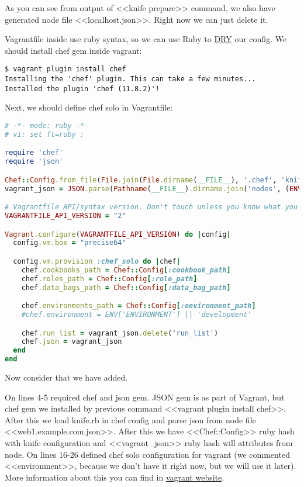 As you can see from output of <<knife prepare>> command, we also have generated node file <<localhost.json>>. Right now we can just delete it.

Vagrantfile inside use ruby syntax, so we can use Ruby to \href{http://en.wikipedia.org/wiki/Dont\_repeat\_yourself}{DRY} our config. We should install chef gem inside vagrant:

\begin{lstlisting}[label=lst:my-cloud-vagrant6,title=my-cloud/nodes/Vagrantfile]
$ vagrant plugin install chef
Installing the 'chef' plugin. This can take a few minutes...
Installed the plugin 'chef (11.8.2)'!
\end{lstlisting}

Next, we should define chef solo in Vagrantfile:

\begin{lstlisting}[language=Ruby,label=lst:my-cloud-vagrant7,title=my-cloud/nodes/Vagrantfile]
# -*- mode: ruby -*-
# vi: set ft=ruby :

require 'chef'
require 'json'

Chef::Config.from_file(File.join(File.dirname(__FILE__), '.chef', 'knife.rb'))
vagrant_json = JSON.parse(Pathname(__FILE__).dirname.join('nodes', (ENV['NODE'] || 'web1.example.com.json')).read)

# Vagrantfile API/syntax version. Don't touch unless you know what you're doing!
VAGRANTFILE_API_VERSION = "2"

Vagrant.configure(VAGRANTFILE_API_VERSION) do |config|
  config.vm.box = "precise64"

  config.vm.provision :chef_solo do |chef|
    chef.cookbooks_path = Chef::Config[:cookbook_path]
    chef.roles_path = Chef::Config[:role_path]
    chef.data_bags_path = Chef::Config[:data_bag_path]

    chef.environments_path = Chef::Config[:environment_path]
    #chef.environment = ENV['ENVIRONMENT'] || 'development'

    chef.run_list = vagrant_json.delete('run_list')
    chef.json = vagrant_json
  end
end
\end{lstlisting}

Now consider that we have added.

On lines 4-5 required chef and json gem. JSON gem is as part of Vagrant, but chef gem we installed by previous command <<vagrant plugin install chef>>. After this we load knife.rb in chef config and parse json from node file <<web1.example.com.json>>. After this we have <<Chef::Config>> ruby hash with knife configuration and <<vagrant\_json>> ruby hash will attributes from node. On lines 16-26 defined chef solo configuration for vagrant (we commented <<environment>>, because we don't have it right now, but we will use it later). More information about this you can find in \href{http://docs.vagrantup.com/v2/provisioning/chef\_solo.html}{vagrant website}.

